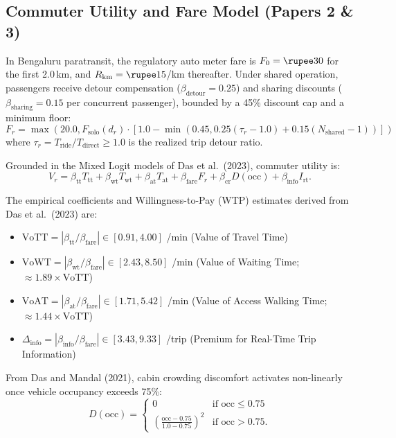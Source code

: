 \subsection{Commuter Utility and Fare Model (Papers 2 \& 3)}
In Bengaluru paratransit, the regulatory auto meter fare is $F_0 = \text{\rupee}30$ for the first 2.0\,km, and $R_{\mathrm{km}} = \text{\rupee}15$/km thereafter. Under shared operation, passengers receive detour compensation ($\beta_{\mathrm{detour}} = 0.25$) and sharing discounts ($\beta_{\mathrm{sharing}} = 0.15$ per concurrent passenger), bounded by a 45\% discount cap and a  minimum floor:
\begin{equation}
F_r = \max\left(20.0, F_{\mathrm{solo}}(d_r) \cdot \left[1.0 - \min\left(0.45, 0.25(\tau_r - 1.0) + 0.15(N_{\mathrm{shared}} - 1)\right)\right]\right)
\label{eq:fare-formula}
\end{equation}
where $\tau_r = T_{\mathrm{ride}} / T_{\mathrm{direct}} \ge 1.0$ is the realized trip detour ratio.

Grounded in the Mixed Logit models of Das et al.\ (2023), commuter utility is:
\begin{equation}
V_r = \beta_{\mathrm{tt}} T_{\mathrm{tt}} + \beta_{\mathrm{wt}} T_{\mathrm{wt}} + \beta_{\mathrm{at}} T_{\mathrm{at}} + \beta_{\mathrm{fare}} F_r + \beta_{\mathrm{cr}} D(\mathrm{occ}) + \beta_{\mathrm{info}} I_{\mathrm{rt}}.
\label{eq:utility-formula}
\end{equation}

The empirical coefficients and Willingness-to-Pay (WTP) estimates derived from Das et al.\ (2023) are:
\begin{itemize}
\item $\text{VoTT} = |\beta_{\mathrm{tt}}/\beta_{\mathrm{fare}}| \in [0.91, 4.00]$ \rupee/min (Value of Travel Time)
\item $\text{VoWT} = |\beta_{\mathrm{wt}}/\beta_{\mathrm{fare}}| \in [2.43, 8.50]$ \rupee/min (Value of Waiting Time; $\approx 1.89\times \text{VoTT}$)
\item $\text{VoAT} = |\beta_{\mathrm{at}}/\beta_{\mathrm{fare}}| \in [1.71, 5.42]$ \rupee/min (Value of Access Walking Time; $\approx 1.44\times \text{VoTT}$)
\item $\Delta_{\mathrm{info}} = |\beta_{\mathrm{info}}/\beta_{\mathrm{fare}}| \in [3.43, 9.33]$ \rupee/trip (Premium for Real-Time Trip Information)
\end{itemize}

From Das and Mandal (2021), cabin crowding discomfort activates non-linearly once vehicle occupancy exceeds 75\%:
\begin{equation}
D(\mathrm{occ}) = \begin{cases} 0 & \text{if } \mathrm{occ} \le 0.75 \\ \left(\frac{\mathrm{occ} - 0.75}{1.0 - 0.75}\right)^2 & \text{if } \mathrm{occ} > 0.75. \end{cases}
\label{eq:crowding-discomfort}
\end{equation}

